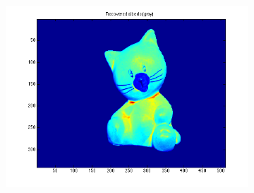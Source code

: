\documentclass{paper}
\begin{document}
\begin{figure}[h!]
\begin{subfigure}{0.3\textwidth}
    \end{subfigure}
    ~
    \begin{subfigure}{0.3\textwidth}
        \includegraphics[width=\textwidth]{results/cat/cat_rec_a}
    \end{subfigure}
    

\end{figure}
\end{document}
